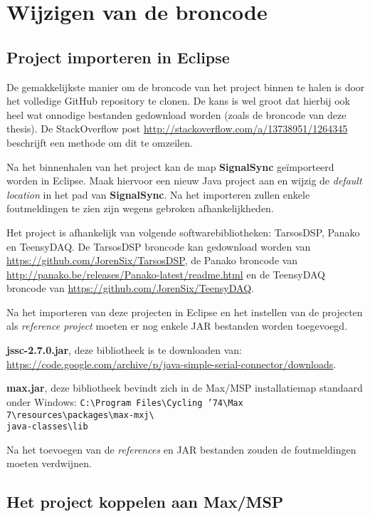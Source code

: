 \section{Wijzigen van de broncode}

\subsection*{Project importeren in Eclipse}

De gemakkelijkste manier om de broncode van het project binnen te halen is door het volledige GitHub repository te clonen. De kans is wel groot dat hierbij ook heel wat onnodige bestanden gedownload worden (zoals de broncode van deze thesis). De StackOverflow post \url{http://stackoverflow.com/a/13738951/1264345} beschrijft een methode om dit te omzeilen. 

Na het binnenhalen van het project kan de map \textbf{SignalSync} geïmporteerd worden in Eclipse. Maak hiervoor een nieuw Java project aan en wijzig de \textit{default location} in het pad van \textbf{SignalSync}. Na het importeren zullen enkele foutmeldingen te zien zijn wegens gebroken afhankelijkheden. 

Het project is afhankelijk van volgende softwarebibliotheken: TarsosDSP, Panako en TeensyDAQ. De TarsosDSP broncode kan gedownload worden van \url{https://github.com/JorenSix/TarsosDSP}, de Panako broncode van \url{http://panako.be/releases/Panako-latest/readme.html} en de TeensyDAQ broncode van \url{https://github.com/JorenSix/TeensyDAQ}. 

Na het importeren van deze projecten in Eclipse en het instellen van de projecten als \textit{reference project} moeten er nog enkele JAR bestanden worden toegevoegd. 

\textbf{jssc-2.7.0.jar}, deze bibliotheek is te downloaden van: \url{https://code.google.com/archive/p/java-simple-serial-connector/downloads}.

\textbf{max.jar}, deze bibliotheek bevindt zich in de Max/MSP installatiemap standaard onder Windows: \texttt{C:\textbackslash Program Files\textbackslash Cycling '74\textbackslash Max 7\textbackslash resources\textbackslash packages\textbackslash max-mxj\textbackslash \\ java-classes\textbackslash lib}

Na het toevoegen van de \textit{references} en JAR bestanden zouden de foutmeldingen moeten verdwijnen.

\subsection*{Het project koppelen aan Max/MSP}

